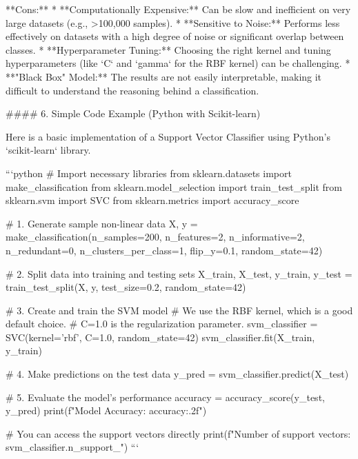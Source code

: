 \documentclass{article}
\begin{document}
**Cons:**
*   **Computationally Expensive:** Can be slow and inefficient on very large datasets (e.g., >100,000 samples).
*   **Sensitive to Noise:** Performs less effectively on datasets with a high degree of noise or significant overlap between classes.
*   **Hyperparameter Tuning:** Choosing the right kernel and tuning hyperparameters (like `C` and `gamma` for the RBF kernel) can be challenging.
*   **"Black Box" Model:** The results are not easily interpretable, making it difficult to understand the reasoning behind a classification.

#### 6. Simple Code Example (Python with Scikit-learn)

Here is a basic implementation of a Support Vector Classifier using Python's `scikit-learn` library.

```python
# Import necessary libraries
from sklearn.datasets import make_classification
from sklearn.model_selection import train_test_split
from sklearn.svm import SVC
from sklearn.metrics import accuracy_score

# 1. Generate sample non-linear data
X, y = make_classification(n_samples=200, n_features=2, n_informative=2, n_redundant=0, n_clusters_per_class=1, flip_y=0.1, random_state=42)

# 2. Split data into training and testing sets
X_train, X_test, y_train, y_test = train_test_split(X, y, test_size=0.2, random_state=42)

# 3. Create and train the SVM model
# We use the RBF kernel, which is a good default choice.
# C=1.0 is the regularization parameter.
svm_classifier = SVC(kernel='rbf', C=1.0, random_state=42)
svm_classifier.fit(X_train, y_train)

# 4. Make predictions on the test data
y_pred = svm_classifier.predict(X_test)

# 5. Evaluate the model's performance
accuracy = accuracy_score(y_test, y_pred)
print(f"Model Accuracy: {accuracy:.2f}")

# You can access the support vectors directly
print(f"Number of support vectors: {svm_classifier.n_support_}")
```
\end{document}

